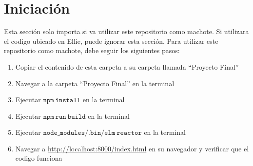 \documentclass{article}
\begin{document}
\section*{Iniciaci\'on}
Esta secci\'on solo importa si va utilizar este repositorio como machote. Si utilizara
el codigo ubicado en Ellie, puede ignorar esta secci\'on. Para utilizar este repositorio
como machote, debe seguir los siguientes pasos:
\begin{enumerate}
        \item{Copiar el contenido de esta carpeta a su carpeta llamada ``Proyecto Final''}
        \item{Navegar a la carpeta ``Proyecto Final'' en la terminal}
        \item{Ejecutar $\mathtt{npm\ install}$ en la terminal}
        \item{Ejecutar $\mathtt{npm\ run\ build}$ en la terminal}
        \item{Ejecutar $\mathtt{node\_modules/.bin/elm\ reactor}$ en la terminal}
        \item{Navegar a \url{http://localhost:8000/index.html} en su navegador y verificar
        que el codigo funciona}
\end{enumerate}
\end{document}
